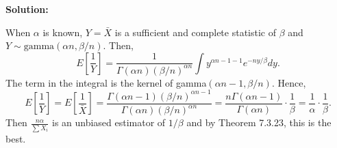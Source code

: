 \documentclass[11pt]{article}
\newcommand{\Sol}{\par {\bf Solution:}}
\begin{document}
\Sol

When $\alpha$ is known, $Y = \bar X$ is a sufficient and complete statistic of $\beta$ and $Y \sim \text{gamma}(\alpha n, \beta/n)$.
Then,
\[
E[\frac{1}{Y}] = \frac{1}{\Gamma(\alpha n){(\beta/n)}^{\alpha n}} \int y^{\alpha n - 1 - 1}e^{-ny/\beta} dy.
\]
The term in the integral is the kernel of gamma$(\alpha n - 1, \beta/n)$. Hence,
\[
E[\frac{1}{Y}] = E[\frac{1}{\bar X}] = \frac{\Gamma(\alpha n - 1){(\beta/n)}^{\alpha n - 1}}{\Gamma(\alpha n){(\beta/n)}^{\alpha n }} = \frac{n\Gamma(\alpha n - 1)}{\Gamma(\alpha n)} \cdot \frac{1}{\beta} = \frac{1}{\alpha} \cdot \frac{1}{\beta}.
\]
Then $\frac{n\alpha}{\sum X_i}$ is an unbiased estimator of $1/\beta$ and by Theorem 7.3.23, this is the best.
\end{document}
